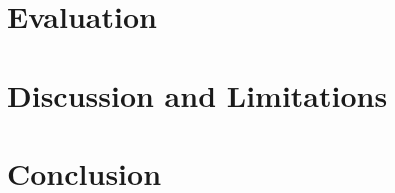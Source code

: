 \documentclass[conference]{IEEEtran}
\begin{document}
\section{Evaluation}

\section{Discussion and Limitations}

\section{Conclusion}



\end{document}
